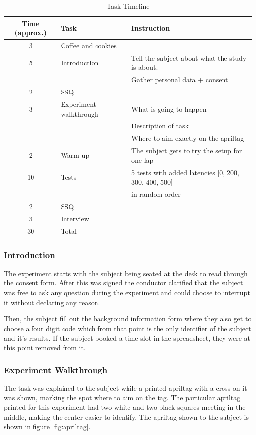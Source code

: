 \documentclass[nofilelist]{cslthse-msc}
\begin{document}
\begin{table}[ht]
   \centering
   \caption{Task Timeline}
   \label{tab:task-timeline}
   \begin{tabular}{|c|l|l|}
   \hline
   \textbf{Time (approx.)} & \textbf{Task} & \textbf{Instruction} \\ \hline
   3 & Coffee and cookies & \\ \hline
   5 & Introduction & Tell the subject about what the study is about. \\
   & & Gather personal data + consent \\ \hline
   2 & SSQ & \\ \hline
   3 & Experiment walkthrough & What is going to happen \\
   & & Description of task \\
   & & Where to aim exactly on the apriltag \\ \hline
   2 & Warm-up & The subject gets to try the setup for one lap \\ \hline
   10 & Tests & 5 tests with added latencies [0, 200, 300, 400, 500] \\ 
   & & in random order \\ \hline
   2 & SSQ & \\ \hline
   3 & Interview & \\ \hline
   30 & Total & \\ \hline
   \end{tabular}
\end{table}

\subsubsection{Introduction}
The experiment starts with the subject being seated at the desk to read through the consent form. After this was signed the conductor clarified that the subject was free to ask any question during the experiment and could choose to interrupt it without declaring any reason. 

Then, the subject fill out the background information form where they also get to choose a four digit code which from that point is the only identifier of the subject and it's results. If the subject booked a time slot in the spreadsheet, they were at this point removed from it.

\subsubsection{Experiment Walkthrough}
The task was explained to the subject while a printed apriltag with a cross on it was shown, marking the spot where to aim on the tag. The particular apriltag printed for this experiment had two white and two black squares meeting in the middle, making the center easier to identify. The apriltag shown to the subject is shown in figure \ref{fig:apriltag}.
\end{document}
